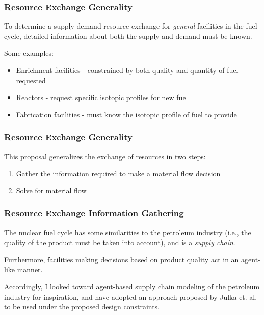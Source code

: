 
\begin{frame}[ctb!]
  \frametitle{Resource Exchange Generality}

  To determine a supply-demand resource exchange for \textit{general} facilities
  in the fuel cycle, detailed information about both the supply and demand must
  be known.

  \vspace{0.2cm}
  
  Some examples:
  
  \begin{itemize}
    \item Enrichment facilities - constrained by both quality and quantity of fuel
      requested
    \item Reactors - request specific isotopic profiles for new fuel
    \item Fabrication facilities - must know the isotopic profile of fuel to
      provide
  \end{itemize}
  
\end{frame}

\begin{frame}[ctb!]
  \frametitle{Resource Exchange Generality}

  This proposal generalizes the exchange of resources in two steps:

  \begin{enumerate}
    \item Gather the information required to make a material flow decision
    \item Solve for material flow
  \end{enumerate}
\end{frame}

\begin{frame}[ctb!]
  \frametitle{Resource Exchange Information Gathering}

  The nuclear fuel cycle has some similarities to the petroleum industry (i.e.,
  the quality of the product must be taken into account), and is a
  \textit{supply chain}.\vspace{0.2cm}

  Furthermore, facilities making decisions based on product quality act in an
  agent-like manner.\vspace{0.2cm} 

  Accordingly, I looked toward agent-based supply chain modeling of the
  petroleum industry for inspiration, and have adopted an approach proposed by
  Julka et. al. \cite{julka_agent-based_2002} to be used under the proposed
  \Cyclus design constraints.
\end{frame}

